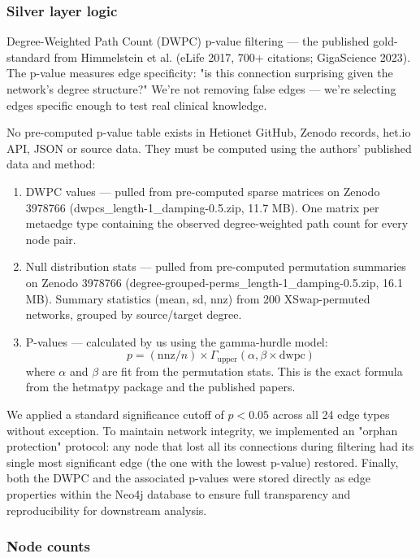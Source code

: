 \subsubsection{Silver layer logic}
\label{subsubsec:hetionet_silver_layer}
Degree-Weighted Path Count (DWPC) p-value filtering — the published gold-standard from Himmelstein et al. (eLife 2017, 700+ citations; GigaScience 2023). The p-value measures edge specificity: "is this connection surprising given the network's degree structure?" We're not removing false edges — we're selecting edges specific enough to test real clinical knowledge.
 
No pre-computed p-value table exists in Hetionet GitHub, Zenodo records, het.io API, JSON or source data. They must be computed using the authors' published data and method:

 \begin{enumerate}
    \item DWPC values — pulled from pre-computed sparse matrices on Zenodo 3978766 (dwpcs_length-1_damping-0.5.zip, 11.7 MB). One matrix per metaedge type containing the observed degree-weighted path count for every node pair.
    \item Null distribution stats — pulled from pre-computed permutation summaries on Zenodo 3978766 (degree-grouped-perms_length-1_damping-0.5.zip, 16.1 MB). Summary statistics (mean, sd, nnz) from 200 XSwap-permuted networks, grouped by source/target degree.
    \item P-values — calculated by us using the gamma-hurdle model:
    \begin{equation}
    p = (\text{nnz}/n) \times \Gamma_{\text{upper}}(\alpha, \beta \times \text{dwpc})
    \end{equation}
    where $\alpha$ and $\beta$ are fit from the permutation stats. This is the exact formula from the hetmatpy package and the published papers.
  \end{enumerate}

 We applied a standard significance cutoff of $p < 0.05$ across all 24 edge types without exception. To maintain network integrity, we implemented an "orphan protection" protocol: any node that lost all its connections during filtering had its single most significant edge (the one with the lowest p-value) restored. 
 Finally, both the DWPC and the associated p-values were stored directly as edge properties within the Neo4j database to ensure full transparency and reproducibility for downstream analysis.


\subsubsection{Node counts}

